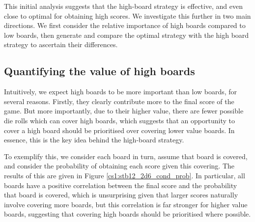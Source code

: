 This initial analysis suggests that the high-board strategy is effective, and even close to optimal for obtaining high scores. We investigate this further in two main directions. We first consider the relative importance of high boards compared to low boards, then generate and compare the optimal strategy with the high board strategy to ascertain their differences.

\subsection{Quantifying the value of high boards}

Intuitively, we expect high boards to be more important than low boards, for several reasons. Firstly, they clearly contribute more to the final score of the game. But more importantly, due to their higher value, there are fewer possible die rolls which can cover high boards, which suggests that an opportunity to cover a high board should be prioritised over covering lower value boards. In essence, this is the key idea behind the high-board strategy. 

To exemplify this, we consider each board in turn, assume that board is covered, and consider the probability of obtaining each score given this covering. The results of this are given in Figure \ref{cs1:stb12_2d6_cond_prob}. In particular, all boards have a positive correlation between the final score and the probability that board is covered, which is unsurprising given that larger scores naturally involve covering more boards, but this correlation is far stronger for higher value boards, suggesting that covering high boards should be prioritised where possible.

